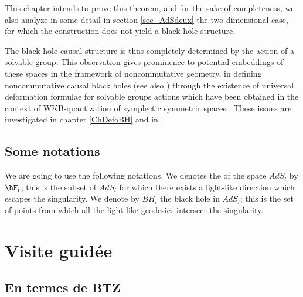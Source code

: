 This chapter intends to prove this theorem, and for the sake of completeness, we also analyze in some detail in section \ref{sec_AdSdeux} the two-dimensional case, for which the construction does not yield a black hole structure.

The black hole causal structure is thus completely determined by the action of a solvable group.  This observation gives prominence to potential embeddings of these spaces in the framework of noncommutative geometry, in defining noncommutative causal black holes (see also \cite{BDRS}) through the existence of universal deformation formulae for solvable groups actions which have been obtained in the context of WKB-quantization of symplectic symmetric spaces \cite{StrictSolvableSym,Biel-Massar-2}. These issues are investigated in chapter \ref{ChDefoBH} and in \cite{articleBVCS}.


					\subsection{Some notations}

We are going to use the following notations. We denotes the  of the space $AdS_l$ by $\hF_l$; this is the subset of $AdS_l$ for which there exists a light-like direction which escapes the singularity. We denote by $BH_l$ the black hole in $AdS_l$; this is the set of points from which all the light-like geodesics intersect the singularity.



\section{Visite guidée}

\subsection{En termes de BTZ}

